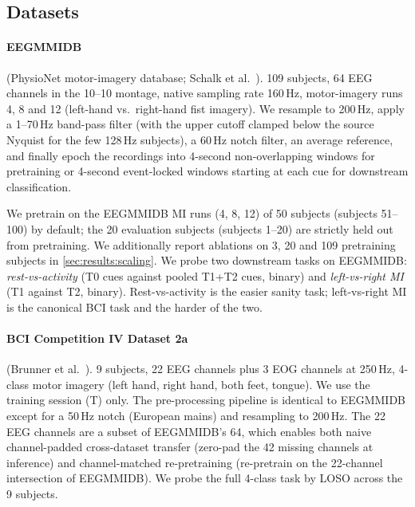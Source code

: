 \subsection{Datasets}
\label{sec:method:data}

\paragraph{EEGMMIDB} (PhysioNet motor-imagery database; Schalk et
al.~\cite{eegmmidb2004}). 109 subjects, 64 EEG channels in the 10--10
montage, native sampling rate 160\,Hz, motor-imagery runs 4, 8 and 12
(left-hand vs.\ right-hand fist imagery). We resample to 200\,Hz, apply a
1--70\,Hz band-pass filter (with the upper cutoff clamped below the
source Nyquist for the few 128\,Hz subjects), a 60\,Hz notch filter, an
average reference, and finally epoch the recordings into 4-second
non-overlapping windows for pretraining or 4-second event-locked windows
starting at each cue for downstream classification.

We pretrain on the EEGMMIDB MI runs (4, 8, 12) of 50 subjects (subjects
51--100) by default; the 20 evaluation subjects (subjects 1--20) are
strictly held out from pretraining. We additionally report
ablations on 3, 20 and 109 pretraining subjects in
\cref{sec:results:scaling}. We probe two downstream tasks on
EEGMMIDB:
\emph{rest-vs-activity} (T0 cues against pooled T1+T2 cues, binary) and
\emph{left-vs-right MI} (T1 against T2, binary). Rest-vs-activity is the
easier sanity task; left-vs-right MI is the canonical BCI task and the
harder of the two.

\paragraph{BCI Competition IV Dataset 2a} (Brunner et
al.~\cite{bciiv2a}). 9 subjects, 22 EEG channels plus 3 EOG channels at
250\,Hz, 4-class motor imagery (left hand, right hand, both feet, tongue).
We use the training session (T) only. The pre-processing pipeline is
identical to EEGMMIDB except for a 50\,Hz notch (European mains) and
resampling to 200\,Hz. The 22 EEG channels are a subset of EEGMMIDB's 64,
which enables both naive channel-padded cross-dataset transfer (zero-pad
the 42 missing channels at inference) and channel-matched re-pretraining
(re-pretrain on the 22-channel intersection of EEGMMIDB). We probe the
full 4-class task by LOSO across the 9 subjects.
